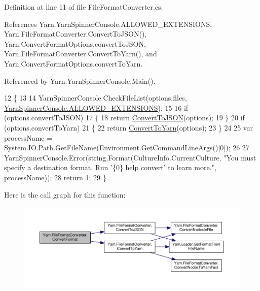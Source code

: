 Definition at line 11 of file File\-Format\-Converter.\-cs.



References Yarn.\-Yarn\-Spinner\-Console.\-A\-L\-L\-O\-W\-E\-D\-\_\-\-E\-X\-T\-E\-N\-S\-I\-O\-N\-S, Yarn.\-File\-Format\-Converter.\-Convert\-To\-J\-S\-O\-N(), Yarn.\-Convert\-Format\-Options.\-convert\-To\-J\-S\-O\-N, Yarn.\-File\-Format\-Converter.\-Convert\-To\-Yarn(), and Yarn.\-Convert\-Format\-Options.\-convert\-To\-Yarn.



Referenced by Yarn.\-Yarn\-Spinner\-Console.\-Main().


\begin{DoxyCode}
12         \{
13 
14             YarnSpinnerConsole.CheckFileList(options.files, 
      \hyperlink{a00197_a0979de7ea02c8c0375b8220a12e6575e}{YarnSpinnerConsole.ALLOWED\_EXTENSIONS});
15 
16             \textcolor{keywordflow}{if} (options.convertToJSON)
17             \{
18                 \textcolor{keywordflow}{return} \hyperlink{a00107_a28a086a7b44ecea7430af40436f38df6}{ConvertToJSON}(options);
19             \}
20             \textcolor{keywordflow}{if} (options.convertToYarn)
21             \{
22                 \textcolor{keywordflow}{return} \hyperlink{a00107_a1e6cd39b0c813f21da278367dcff76d2}{ConvertToYarn}(options);
23             \}
24 
25             var processName = System.IO.Path.GetFileName(Environment.GetCommandLineArgs()[0]);
26 
27             YarnSpinnerConsole.Error(string.Format(CultureInfo.CurrentCulture, \textcolor{stringliteral}{"You must specify a
       destination format. Run '\{0\} help convert' to learn more."}, processName));
28             \textcolor{keywordflow}{return} 1;
29         \}
\end{DoxyCode}


Here is the call graph for this function\-:
\nopagebreak
\begin{figure}[H]
\begin{center}
\leavevmode
\includegraphics[width=350pt]{a00107_aa4db4ccac799c5f047a8b1a9efbe109d_cgraph}
\end{center}
\end{figure}




